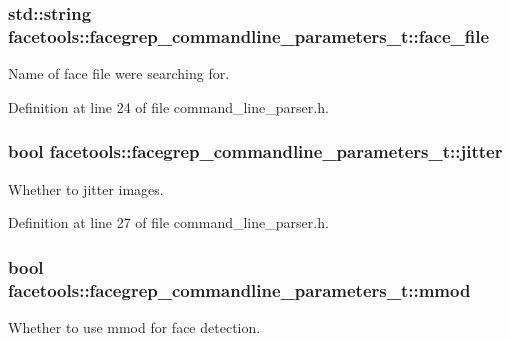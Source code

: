 \subsubsection[{\texorpdfstring{face\+\_\+file}{face_file}}]{\setlength{\rightskip}{0pt plus 5cm}std\+::string facetools\+::facegrep\+\_\+commandline\+\_\+parameters\+\_\+t\+::face\+\_\+file}\hypertarget{structfacetools_1_1facegrep__commandline__parameters__t_a2537494d9d0d80d128a08a05bd81a145}{}\label{structfacetools_1_1facegrep__commandline__parameters__t_a2537494d9d0d80d128a08a05bd81a145}
Name of face file we\textquotesingle{}re searching for. 

Definition at line 24 of file command\+\_\+line\+\_\+parser.\+h.

\subsubsection[{\texorpdfstring{jitter}{jitter}}]{\setlength{\rightskip}{0pt plus 5cm}bool facetools\+::facegrep\+\_\+commandline\+\_\+parameters\+\_\+t\+::jitter}\hypertarget{structfacetools_1_1facegrep__commandline__parameters__t_ada0cdf1d97bd98420c5dcd06901f0f70}{}\label{structfacetools_1_1facegrep__commandline__parameters__t_ada0cdf1d97bd98420c5dcd06901f0f70}
Whether to jitter images. 

Definition at line 27 of file command\+\_\+line\+\_\+parser.\+h.

\subsubsection[{\texorpdfstring{mmod}{mmod}}]{\setlength{\rightskip}{0pt plus 5cm}bool facetools\+::facegrep\+\_\+commandline\+\_\+parameters\+\_\+t\+::mmod}\hypertarget{structfacetools_1_1facegrep__commandline__parameters__t_a49b0b6fdc5881378d22b81c48e509b30}{}\label{structfacetools_1_1facegrep__commandline__parameters__t_a49b0b6fdc5881378d22b81c48e509b30}
Whether to use mmod for face detection. 

